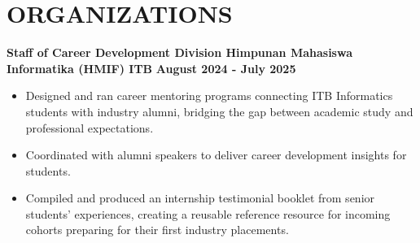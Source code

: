 \documentclass[10pt, a4paper]{article}
\begin{document}
\section*{ORGANIZATIONS}
\noindent
\textbf{Staff of Career Development Division \textbar{} Himpunan Mahasiswa Informatika (HMIF) ITB} \hfill \textbf{August 2024 - July 2025}
\begin{itemize}[leftmargin=0.25in, topsep=2pt, itemsep=0pt, parsep=2pt]
    \item Designed and ran career mentoring programs connecting ITB Informatics students with industry alumni, bridging the gap between academic study and professional expectations.
    \item Coordinated with alumni speakers to deliver career development insights for students.
    \item Compiled and produced an internship testimonial booklet from senior students' experiences, creating a reusable reference resource for incoming cohorts preparing for their first industry placements.
\end{itemize}
\end{document}
